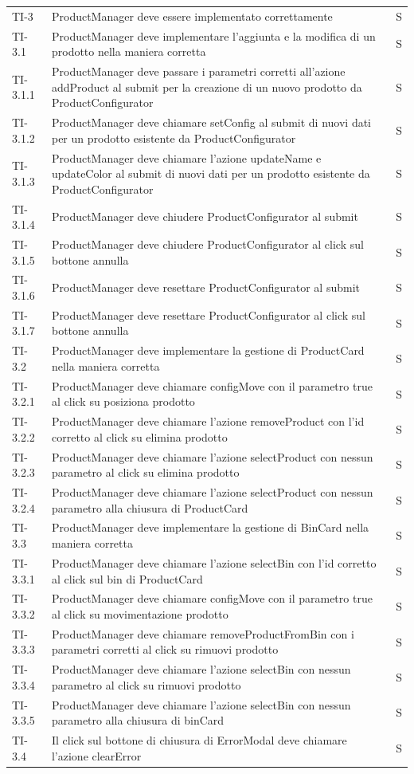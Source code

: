 \begin{xltabular}{0.9\textwidth}{X | p{0.6\textwidth}  | p{0.1\textwidth}}
    TI-3 & ProductManager deve essere implementato correttamente & S\\
    TI-3.1 & ProductManager deve implementare l'aggiunta e la modifica di un prodotto nella maniera corretta & S\\
    TI-3.1.1 & ProductManager deve passare i parametri corretti all'azione addProduct al submit per la creazione di un nuovo prodotto da ProductConfigurator & S\\
    TI-3.1.2 & ProductManager deve chiamare setConfig al submit di nuovi dati per un prodotto esistente da ProductConfigurator & S\\
    TI-3.1.3 & ProductManager deve chiamare l'azione updateName e updateColor al submit di nuovi dati per un prodotto esistente da ProductConfigurator & S\\
    TI-3.1.4 & ProductManager deve chiudere ProductConfigurator al submit & S\\
    TI-3.1.5 & ProductManager deve chiudere ProductConfigurator al click sul bottone annulla & S\\
    TI-3.1.6 & ProductManager deve resettare ProductConfigurator al submit & S\\
    TI-3.1.7 & ProductManager deve resettare ProductConfigurator al click sul bottone annulla & S\\
    TI-3.2 & ProductManager deve implementare la gestione di ProductCard nella maniera corretta & S\\
    TI-3.2.1 & ProductManager deve chiamare configMove con il parametro true al click su posiziona prodotto & S\\
    TI-3.2.2 & ProductManager deve chiamare l'azione removeProduct con l'id corretto al click su elimina prodotto & S\\
    TI-3.2.3 & ProductManager deve chiamare l'azione selectProduct con nessun parametro al click su elimina prodotto & S\\
    TI-3.2.4 & ProductManager deve chiamare l'azione selectProduct con nessun parametro alla chiusura di ProductCard & S\\
    TI-3.3 & ProductManager deve implementare la gestione di BinCard nella maniera corretta & S\\
    TI-3.3.1 & ProductManager deve chiamare l'azione selectBin con l'id corretto al click sul bin di ProductCard & S\\
    TI-3.3.2 & ProductManager deve chiamare configMove con il parametro true al click su movimentazione prodotto & S\\
    TI-3.3.3 & ProductManager deve chiamare removeProductFromBin con i parametri corretti al click su rimuovi prodotto & S\\
    TI-3.3.4 & ProductManager deve chiamare l'azione selectBin con nessun parametro al click su rimuovi prodotto & S\\
    TI-3.3.5 & ProductManager deve chiamare l'azione selectBin con nessun parametro alla chiusura di binCard & S\\
    TI-3.4 & Il click sul bottone di chiusura di ErrorModal deve chiamare l'azione clearError & S\\


\end{xltabular}
